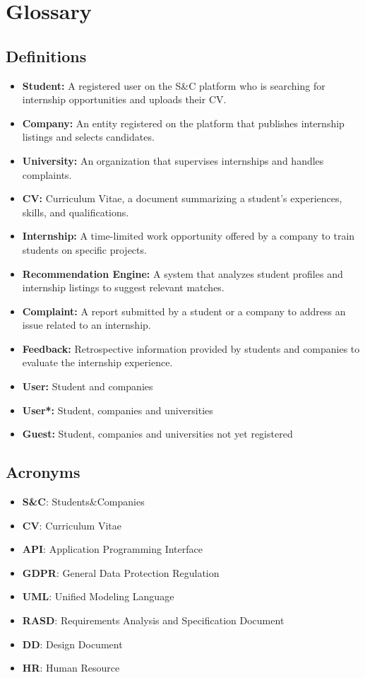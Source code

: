\section{Glossary}\label{sec:definitions-acronyms-abbreviations}
\subsection{Definitions}\label{subsec:definition}
\begin{itemize}
    \item \textbf{Student:} A registered user on the S\&C platform who is searching for internship opportunities and uploads their CV.
    \item \textbf{Company:} An entity registered on the platform that publishes internship listings and selects candidates.
    \item \textbf{University:} An organization that supervises internships and handles complaints.
    \item \textbf{CV:} Curriculum Vitae, a document summarizing a student's experiences, skills, and qualifications.
    \item \textbf{Internship:} A time-limited work opportunity offered by a company to train students on specific projects.
    \item \textbf{Recommendation Engine:} A system that analyzes student profiles and internship listings to suggest relevant matches.
    \item \textbf{Complaint:} A report submitted by a student or a company to address an issue related to an internship.
    \item \textbf{Feedback:} Retrospective information provided by students and companies to evaluate the internship experience.
    \item \textbf{User:} Student and companies
    \item \textbf{User*:} Student, companies and universities
    \item \textbf{Guest:} Student, companies and universities not yet registered
\end{itemize}

\subsection{Acronyms}\label{subsec:acronyms}
\begin{itemize}
    \item \textbf{S\&C}: Students\&Companies
    \item \textbf{CV}: Curriculum Vitae
    \item \textbf{API}: Application Programming Interface
    \item \textbf{GDPR}: General Data Protection Regulation
    \item \textbf{UML}: Unified Modeling Language
    \item \textbf{RASD}: Requirements Analysis and Specification Document
    \item \textbf{DD}: Design Document
    \item \textbf{HR}: Human Resource
\end{itemize}

